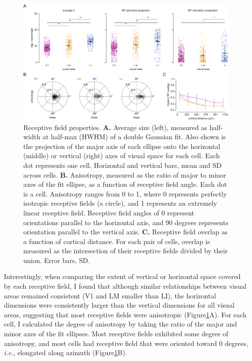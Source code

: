 \begin{figure}[t!]
    \includegraphics[width=\textwidth]{figures/chapter_3/fig_3-5_rf_aggregate/fig_3-5_rf_aggregate.pdf}
    \vspace{.1in}
    \caption[Receptive field properties]{Receptive field properties. 
    \textbf{A.} Average size (left), measured as half-width at half-max (HWHM) of a double Gaussian fit. Also shown is the projection of the major axis of each ellipse onto the horizontal (middle) or vertical (right) axes of visual space for each cell. Each dot represents one cell. Horizontal and vertical bars, mean and SD across cells. 
    \textbf{B.} Anisotropy, measured as the ratio of major to minor axes of the fit ellipse, as a function of receptive field angle. Each dot is a cell. Anisotropy ranges from 0 to 1, where 0 represents perfectly isotropic receptive fields (a circle), and 1 represents an extremely linear receptive field. Receptive field angles of 0 represent orientations parallel to the horizontal axis, and 90 degrees represents orientation parallel to the vertical axis.
    \textbf{C.} Receptive field overlap as a function of cortical distance. For each pair of cells, overlap is measured as the intersection of their receptive fields divided by their union. Error bars, SD.  
    \label{fig:rf_aggregate}}
\end{figure}

Interestingly, when comparing the extent of vertical or horizontal space covered by each receptive field, I found that although similar relationships between visual areas remained consistent (V1 and LM smaller than LI), the horizontal dimensions were consistently larger than the vertical dimensions for all visual areas, suggesting that most receptive fields were anisotropic (Figure\ref{fig:rf_aggregate}A). For each cell, I calculated the degree of anisotropy by taking the ratio of the major and minor axes of the fit ellipses. Most receptive fields exhibited some degree of anisotropy, and most cells had receptive field that were oriented toward 0 degrees, \textit{i.e.}, elongated along azimuth (Figure\ref{fig:rf_aggregate}B). 


